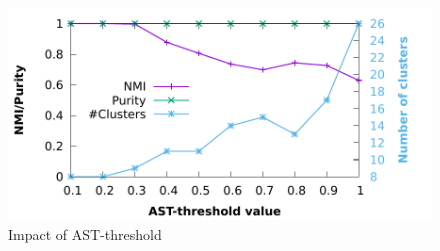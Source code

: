 \begin{figure}[h]
  \centerline{\includegraphics[width=\linewidth]{../charts/param_analysis/maxuse_quality.pdf}}
  \caption{Impact of AST-threshold}\label{fig:ast-qual}
\end{figure}
